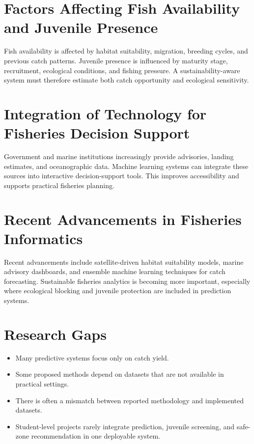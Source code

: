 \documentclass[12pt,a4paper]{report}
\begin{document}
\section{Factors Affecting Fish Availability and Juvenile Presence}
Fish availability is affected by habitat suitability, migration, breeding cycles, and previous catch patterns. Juvenile presence is influenced by maturity stage, recruitment, ecological conditions, and fishing pressure. A sustainability-aware system must therefore estimate both catch opportunity and ecological sensitivity.

\section{Integration of Technology for Fisheries Decision Support}
Government and marine institutions increasingly provide advisories, landing estimates, and oceanographic data. Machine learning systems can integrate these sources into interactive decision-support tools. This improves accessibility and supports practical fisheries planning.

\section{Recent Advancements in Fisheries Informatics}
Recent advancements include satellite-driven habitat suitability models, marine advisory dashboards, and ensemble machine learning techniques for catch forecasting. Sustainable fisheries analytics is becoming more important, especially where ecological blocking and juvenile protection are included in prediction systems.

\section{Research Gaps}
\begin{itemize}[leftmargin=1.5cm]
    \item Many predictive systems focus only on catch yield.
    \item Some proposed methods depend on datasets that are not available in practical settings.
    \item There is often a mismatch between reported methodology and implemented datasets.
    \item Student-level projects rarely integrate prediction, juvenile screening, and safe-zone recommendation in one deployable system.
\end{itemize}
\end{document}
